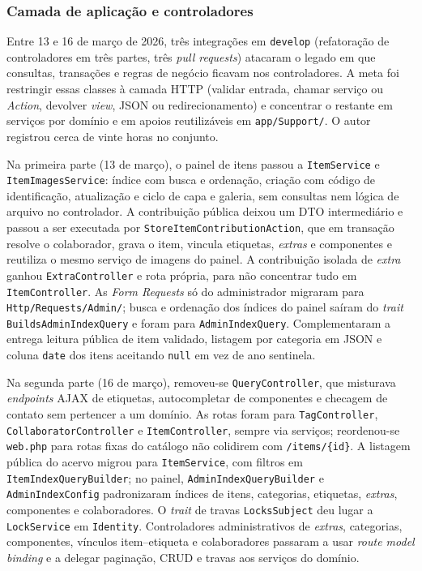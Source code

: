 \subsubsection{Camada de aplicação e controladores}\label{sec:dev-refatoracao-controllers-camada}

Entre 13 e 16 de março de 2026, três integrações em \texttt{develop} (refatoração de controladores em três partes, três \textit{pull requests}) atacaram o legado em que consultas, transações e regras de negócio ficavam nos controladores. A meta foi restringir essas classes à camada HTTP (validar entrada, chamar serviço ou \textit{Action}, devolver \textit{view}, JSON ou redirecionamento) e concentrar o restante em serviços por domínio e em apoios reutilizáveis em \texttt{app/Support/}. O autor registrou cerca de vinte horas no conjunto.

Na primeira parte (13 de março), o painel de itens passou a \texttt{ItemService} e \texttt{ItemImagesService}: índice com busca e ordenação, criação com código de identificação, atualização e ciclo de capa e galeria, sem consultas nem lógica de arquivo no controlador. A contribuição pública deixou um DTO intermediário e passou a ser executada por \texttt{StoreItemContributionAction}, que em transação resolve o colaborador, grava o item, vincula etiquetas, \textit{extras} e componentes e reutiliza o mesmo serviço de imagens do painel. A contribuição isolada de \textit{extra} ganhou \texttt{ExtraController} e rota própria, para não concentrar tudo em \texttt{ItemController}. As \textit{Form Requests} só do administrador migraram para \texttt{Http/Requests/Admin/}; busca e ordenação dos índices do painel saíram do \textit{trait} \texttt{BuildsAdminIndexQuery} e foram para \texttt{AdminIndexQuery}. Complementaram a entrega leitura pública de item validado, listagem por categoria em JSON e coluna \texttt{date} dos itens aceitando \texttt{null} em vez de ano sentinela.

Na segunda parte (16 de março), removeu-se \texttt{QueryController}, que misturava \textit{endpoints} AJAX de etiquetas, autocompletar de componentes e checagem de contato sem pertencer a um domínio. As rotas foram para \texttt{TagController}, \texttt{CollaboratorController} e \texttt{ItemController}, sempre via serviços; reordenou-se \texttt{web.php} para rotas fixas do catálogo não colidirem com \texttt{/items/\{id\}}. A listagem pública do acervo migrou para \texttt{ItemService}, com filtros em \texttt{ItemIndexQueryBuilder}; no painel, \texttt{AdminIndexQueryBuilder} e \texttt{AdminIndexConfig} padronizaram índices de itens, categorias, etiquetas, \textit{extras}, componentes e colaboradores. O \textit{trait} de travas \texttt{LocksSubject} deu lugar a \texttt{LockService} em \texttt{Identity}. Controladores administrativos de \textit{extras}, categorias, componentes, vínculos item--etiqueta e colaboradores passaram a usar \textit{route model binding} e a delegar paginação, CRUD e travas aos serviços do domínio.

